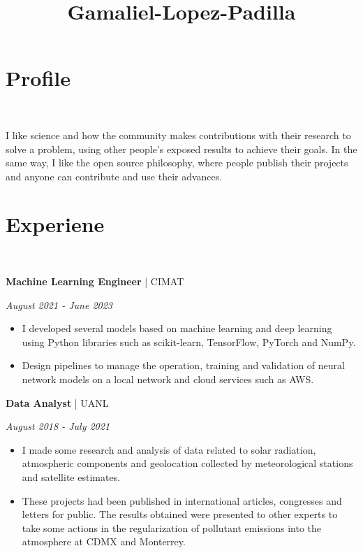 \documentclass[a3paper]{adcv_color}
\title{Gamaliel-Lopez-Padilla}
\newcommand{\work}[3]{
	\begin{minipage}{0.75\linewidth}
		\textbf{#1} | #2
	\end{minipage}
	\begin{minipage}{0.25\linewidth}
		\begin{flushright}
			\textit{#3}
		\end{flushright}
	\end{minipage}
	\vspace{-1cm}
}
\begin{document}
\changefontsizes{14pt}
\section{Profile}\\
\begin{addmargin}[0.5em]{0.2em}
	\begin{flushleft}
		I like science and how the community makes contributions with their research to solve a problem, using other people's exposed results to achieve their goals. In the same way, I like the open source philosophy, where people publish their projects and anyone can contribute and use their advances.
	\end{flushleft}
\end{addmargin}
\section{Experiene}\\
\begin{addmargin}[0.5em]{0.5em}
	\work{Machine Learning Engineer}{CIMAT}{August 2021 - June 2023}
	\begin{itemize}
		\item  I developed several models based on machine learning and deep learning using Python libraries such as scikit-learn, TensorFlow, PyTorch and NumPy.
		\item Design pipelines to manage the operation, training and validation of neural network models on a local network and cloud services such as AWS.
	\end{itemize}
	\work{Data Analyst}{UANL}{August 2018 - July 2021}
	\begin{itemize}
		\item I made some research and analysis of data related to solar radiation, atmospheric components and geolocation collected by meteorological stations and satellite estimates.
		\item These projects had been published in international articles, congresses and letters for public. The results obtained were presented to other experts to take some actions in the regularization of pollutant emissions into the atmosphere at CDMX and Monterrey.
	\end{itemize}
\end{addmargin}
\end{document}
